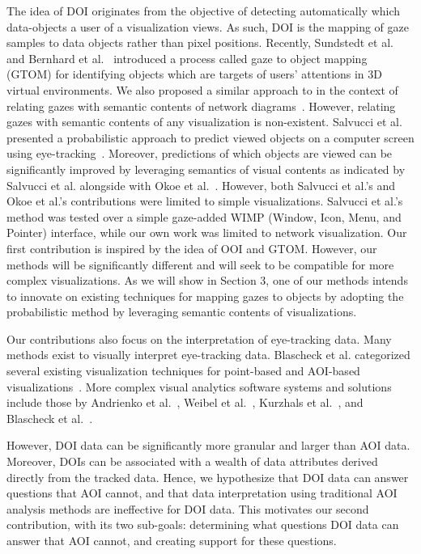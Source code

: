 The idea of DOI originates from the objective of detecting automatically which data-objects a user of a visualization views. As such, DOI is the mapping of gaze samples to data objects rather than pixel positions. Recently, Sundstedt et al.~\cite{Sun13} and Bernhard et al.~\cite{Bern14} introduced a process called gaze to object mapping (GTOM) for identifying objects which are targets of users' attentions in 3D virtual environments. We also proposed a similar approach to in the context of relating gazes with semantic contents of network diagrams~\cite{Okoe14}. However, relating gazes with semantic contents of any visualization is non-existent. Salvucci et al. presented a probabilistic approach to predict viewed objects on a computer screen using eye-tracking~\cite{Sal00}. Moreover, predictions of which objects are viewed can be significantly improved by leveraging semantics of visual contents as indicated by Salvucci et al. alongside with Okoe et al.~\cite{Okoe14}. However, both Salvucci et al.'s and Okoe et al.'s contributions were limited to simple visualizations. Salvucci et al.'s method was tested over a simple gaze-added WIMP (Window, Icon, Menu, and Pointer) interface, while our own work was limited to network visualization. Our first contribution is inspired by the idea of OOI and GTOM. However, our methods will be significantly different and will seek to be compatible for more complex visualizations. As we will show in Section 3, one of our methods intends to innovate on existing techniques for mapping gazes to objects by adopting the probabilistic method by leveraging semantic contents of visualizations. 

Our contributions also focus on the interpretation of eye-tracking data. Many methods exist to visually interpret eye-tracking data.  Blascheck et al. categorized several existing visualization techniques for point-based and AOI-based visualizations~\cite{Bla14}. More complex visual analytics software systems and solutions include those by Andrienko et al.~\cite{And12}, Weibel et al.~\cite{Wei12}, Kurzhals et al.~\cite{Kur14}, and Blascheck et al.~\cite{Bla16}.  

However, DOI data can be significantly more granular and larger than AOI data. Moreover, DOIs can be associated with a wealth of data attributes derived directly from the tracked data. Hence, we hypothesize that DOI data can answer questions that AOI cannot, and that data interpretation using traditional AOI analysis methods are ineffective for DOI data. This motivates our second contribution, with its two sub-goals: determining what questions DOI data can answer that AOI cannot, and creating support for these questions. 

